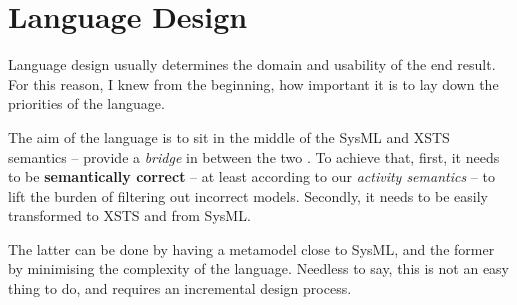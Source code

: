 \clearpage\section{Language Design}

Language design usually determines the domain and usability of the end result. For this reason, I knew from the beginning, how important it is to lay down the priorities of the language.

The aim of the language is to sit in the middle of the SysML and XSTS semantics -- provide a \emph{bridge} in between the two .
To achieve that, first, it needs to be \textbf{semantically correct} -- at least according to our \emph{activity semantics} -- to lift the burden of filtering out incorrect models. Secondly, it needs to be easily transformed to XSTS and from SysML.

The latter can be done by having a metamodel close to SysML, and the former by minimising the complexity of the language. Needless to say, this is not an easy thing to do, and requires an incremental design process.
